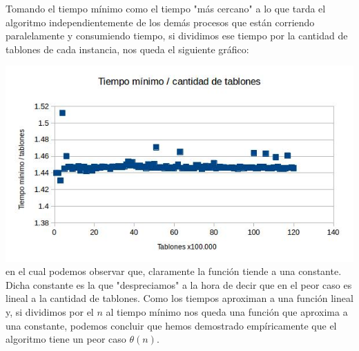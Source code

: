 \documentclass{article}
\begin{document}
Tomando el tiempo m\'inimo como el tiempo "m\'as cercano" a lo que tarda el algoritmo independientemente de los dem\'as procesos que est\'an corriendo paralelamente y consumiendo tiempo, si dividimos ese tiempo por la cantidad de tablones de cada instancia, nos queda el siguiente gr\'afico:

\includegraphics[width=\textwidth,height=\textheight,keepaspectratio
]{puenteconstante.jpg}
en el cual podemos observar que, claramente la funci\'on tiende a una constante. Dicha constante es la que "despreciamos" a la hora de decir que en el peor caso es lineal a la cantidad de tablones. \newline Como los tiempos aproximan a una funci\'on lineal y, si dividimos por el $n$ al tiempo m\'inimo nos queda una funci\'on que aproxima a una constante, podemos concluir que hemos demostrado emp\'iricamente que el algoritmo tiene un peor caso $\theta (n)$.
\end{document}
